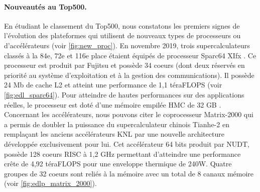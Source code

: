         \paragraph{Nouveautés au Top500.} En étudiant le classement du Top500, nous constatons les premiers signes de l'évolution des plateformes qui utilisent de nouveaux types de processeurs ou d'accélérateurs (voir \autoref{fig:new_proc}). En novembre 2019, trois supercalculateurs classés à la 84e, 72e et 116e place étaient équipés de processeur Sparc64 XIfx \cite{Yoshida2018}. Ce processeur est produit par Fujitsu et possède 34 coeurs (dont deux réservés en priorité au système d'exploitation et à la gestion des communications). Il possède 24 Mb de cache L2 et atteint une performance de 1,1 téraFLOPS (voir \autoref{fig:edl_sparc64}). Pour atteindre de hautes performances sur des applications réelles, le processeur est doté d'une mémoire empilée HMC de 32 GB \cite{Garg2017}. Concernant les accélérateurs, nous pouvons citer le coprocesseur Matrix-2000 qui a permis de doubler la puissance du supercalculateur chinois Tianhe-2 en remplaçant les anciens accélérateurs KNL par une nouvelle architecture développée exclusivement pour lui. Cet accélérateur 64 bits produit par NUDT, possède 128 coeurs RISC à 1,2 GHz permettant d'atteindre une performance crête de 4,92 téraFLOPS pour une enveloppe thermique de 240W. Quatre groupes de 32 coeurs sont reliés à la mémoire avec un total de 8 canaux mémoire (voir \autoref{fig:edlp_matrix_2000}). 
        
